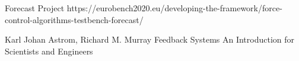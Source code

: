 \documentclass[a4paper,11pt]{article}
\begin{document}
\begin{thebibliography}{9}

Forecast Project https://eurobench2020.eu/developing-the-framework/force-control-algorithms-testbench-forecast/

Karl Johan Astrom, Richard M. Murray Feedback Systems An Introduction for Scientists and Engineers
\end{thebibliography}
\end{document}
